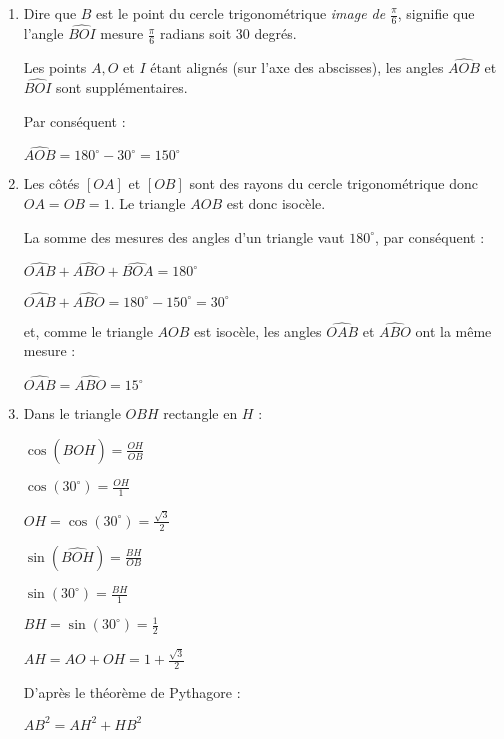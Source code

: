 \begin{corrige}
     \begin{enumerate}
          \item
          Dire que $B$ est le point du cercle trigonométrique \textit{image de $\frac{\pi}{6}$}, signifie que l'angle $\widehat{BOI} $ mesure $ \frac{ \pi }{6} $ radians soit $30$ degrés.
          \par
          Les points $A, O$ et $I$ étant alignés (sur l'axe des abscisses), les angles $\widehat{AOB}$ et $\widehat{BOI}$ sont supplémentaires.
          \par
          Par conséquent :
          \par
          $\widehat{AOB}=180^\circ-30^\circ=150^\circ$
          \item
          Les côtés $[OA]$ et $[OB]$ sont des rayons du cercle trigonométrique donc $OA=OB=1$. Le triangle $AOB$ est donc isocèle.
          \par
          La somme des mesures des angles d'un triangle vaut $180^\circ$, par conséquent :
          \par
          $\widehat{OAB}+\widehat{ABO}+\widehat{BOA}=180^\circ$
          \par
          $\widehat{OAB}+\widehat{ABO} = 180^\circ-150^\circ = 30^\circ$
          \par
          et, comme le triangle $AOB$ est isocèle, les angles $\widehat{OAB}$ et $\widehat{ABO}$ ont la même mesure :
          \par
          $\widehat{OAB} = \widehat{ABO} = 15^\circ$
          \item
          Dans le triangle $OBH$ rectangle en $H$ :
          \par
          $\cos(\widehat{BOH})= \frac{OH}{OB} $
          \par
          $\cos(30^\circ)= \frac{OH}{1} $
          \par
          $OH=\cos(30^\circ)=\frac{\sqrt{3}}{2}$
          \par
          $\sin(\widehat{BOH})= \frac{BH}{OB}$
          \par
          $\sin(30^\circ)= \frac{BH}{1} $
          \par
          $BH=\sin(30^\circ)=\frac{1}{2}$
          \par
          $AH=AO+OH=1+\frac{\sqrt{3}}{2}$
          \par
          D'après le théorème de Pythagore :
          \par
          $AB^2=AH^2+HB^2$

\end{enumerate}
\end{corrige}
